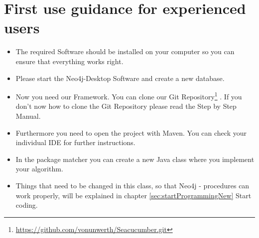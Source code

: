 \section {First use guidance for experienced users} \label{sec:beforeFirstUseNew}
\begin{itemize}
	\item The required Software should be installed on your computer so you can ensure that everything works right.
	\item Please start the Neo4j-Desktop Software and create a new database.
	\item Now you need our Framework. You can clone our \glqq Git Repository\footnote{\url{https://github.com/vonunwerth/Seacucumber.git}} \grqq{}. If you don't now how to clone the \glqq Git Repository\grqq{} please read the Step by Step Manual.
	\item Furthermore you need to open the project with Maven. You can check your individual IDE for further instructions.
	\item In the package \glqq matcher\grqq{} you can create a new Java class where you implement your algorithm.
	\item Things that need to be changed in this class, so that \glqq Neo4j - procedures\grqq{} can work properly, will be explained in chapter \ref{sec:startProgrammingNew} \glqq Start coding\grqq{}.
\end{itemize}

